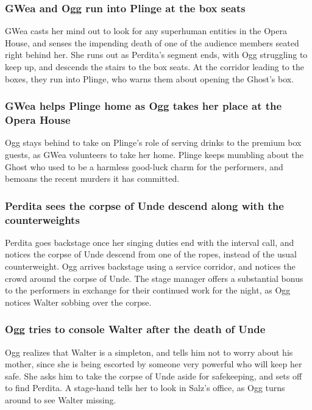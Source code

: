 \subsubsection{\Gls{GWea} and \Gls{Ogg} run into \Gls{Plinge} at the box seats}
\Gls{GWea} casts her mind out to look for any superhuman entities in the Opera House, and senses
the impending death of one of the audience members seated right behind her. She runs out as
\Gls{Perdita}'s segment ends, with \Gls{Ogg} struggling to keep up, and descends the stairs to the
box seats. At the corridor leading to the boxes, they run into \Gls{Plinge}, who warns them about
opening the \Gls{Ghost}'s box.

\subsubsection{\Gls{GWea} helps \Gls{Plinge} home as \Gls{Ogg} takes her place at the Opera House}
\Gls{Ogg} stays behind to take on \Gls{Plinge}'s role of serving drinks to the premium box guests,
as \Gls{GWea} volunteers to take her home. \Gls{Plinge} keeps mumbling about the \Gls{Ghost} who
used to be a harmless good-luck charm for the performers, and bemoans the recent murders it has
committed.

\subsubsection{\Gls{Perdita} sees the corpse of \Gls{Unde} descend along with the counterweights}
\Gls{Perdita} goes backstage once her singing duties end with the interval call, and notices
the corpse of \Gls{Unde} descend from one of the ropes, instead of the usual counterweight.
\Gls{Ogg} arrives backstage using a service corridor, and notices the crowd around the corpse of
\Gls{Unde}. The stage manager offers a substantial bonus to the performers in exchange for their
continued work for the night, as \Gls{Ogg} notices \Gls{Walter} sobbing over the corpse.

\subsubsection{\Gls{Ogg} tries to console \Gls{Walter} after the death of \Gls{Unde}}
\Gls{Ogg} realizes that \Gls{Walter} is a simpleton, and tells him not to worry about his mother,
since she is being escorted by someone very powerful who will keep her safe. She asks him to take
the corpse of \Gls{Unde} aside for safekeeping, and sets off to find \Gls{Perdita}. A stage-hand
tells her to look in \Gls{Salz}'s office, as \Gls{Ogg} turns around to see \Gls{Walter} missing.

